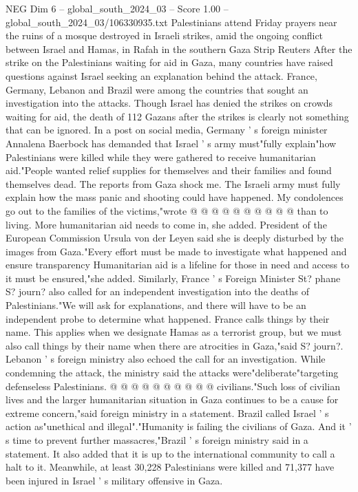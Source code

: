 \begin{textsample}{NEG Dim 6 – global\_south\_2024\_03 – Score 1.00 – global\_south\_2024\_03/106330935.txt}  \label{ex:f6_neg_412}
Palestinians attend Friday prayers near the ruins of a mosque destroyed in Israeli strikes, amid the ongoing conflict between Israel and Hamas, in Rafah in the southern Gaza Strip Reuters After the strike on the Palestinians waiting for aid in Gaza, many countries have raised questions against Israel seeking an explanation behind the attack.
France, Germany, Lebanon and Brazil were among the countries that sought an investigation into the attacks.
Though Israel has denied the strikes on crowds waiting for aid, the death of 112 Gazans after the strikes is clearly not something that can be ignored.
In a post on social media, Germany ' s foreign minister Annalena Baerbock has demanded that Israel ' s army must"fully explain"how Palestinians were killed while they were gathered to receive humanitarian aid."People wanted relief supplies for themselves and their families and found themselves dead.
The reports from Gaza shock me.
The Israeli army must fully explain how the mass panic and shooting could have happened.
My condolences go out to the families of the victims,"wrote @ @ @ @ @ @ @ @ @ @ than to living.
More humanitarian aid needs to come in, she added.
President of the European Commission Ursula von der Leyen said she is deeply disturbed by the images from Gaza."Every effort must be made to investigate what happened and ensure transparency Humanitarian aid is a lifeline for those in need and access to it must be ensured,"she added.
Similarly, France ' s Foreign Minister St? phane S? journ? also called for an independent investigation into the deaths of Palestinians."We will ask for explanations, and there will have to be an independent probe to determine what happened.
France calls things by their name.
This applies when we designate Hamas as a terrorist group, but we must also call things by their name when there are atrocities in Gaza,"said S? journ?.
Lebanon ' s foreign ministry also echoed the call for an investigation.
While condemning the attack, the ministry said the attacks were"deliberate"targeting defenseless Palestinians. @ @ @ @ @ @ @ @ @ @ civilians."Such loss of civilian lives and the larger humanitarian situation in Gaza continues to be a cause for extreme concern,"said foreign ministry in a statement.
Brazil called Israel ' s action as"unethical and illegal"."Humanity is failing the civilians of Gaza.
And it ' s time to prevent further massacres,"Brazil ' s foreign ministry said in a statement.
It also added that it is up to the international community to call a halt to it.
Meanwhile, at least 30,228 Palestinians were killed and 71,377 have been injured in Israel ' s military offensive in Gaza.

\end{textsample}
